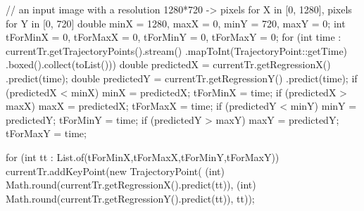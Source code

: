 // an input image with a resolution 1280*720 -> pixels for X in [0, 1280], pixels for Y in [0, 720]
double minX = 1280, maxX = 0, minY = 720, maxY = 0;
int tForMinX = 0, tForMaxX = 0, tForMinY = 0, tForMaxY = 0;
for (int time : currentTr.getTrajectoryPoints().stream()
			.mapToInt(TrajectoryPoint::getTime)
			.boxed().collect(toList())) {
	double predictedX = currentTr.getRegressionX()
							.predict(time);
	double predictedY = currentTr.getRegressionY()
							.predict(time);
	if (predictedX < minX) {
		minX = predictedX;
		tForMinX = time;
	}
	if (predictedX > maxX) {
		maxX = predictedX;
		tForMaxX = time;
	}
	if (predictedY < minY) {
		minY = predictedY;
		tForMinY = time;
	}
	if (predictedY > maxY) {
		maxY = predictedY;
		tForMaxY = time;
	}
}

for (int tt : List.of(tForMinX,tForMaxX,tForMinY,tForMaxY)) {
	currentTr.addKeyPoint(new TrajectoryPoint(
		(int) Math.round(currentTr.getRegressionX().predict(tt)),
		(int) Math.round(currentTr.getRegressionY().predict(tt)),
		tt));
}